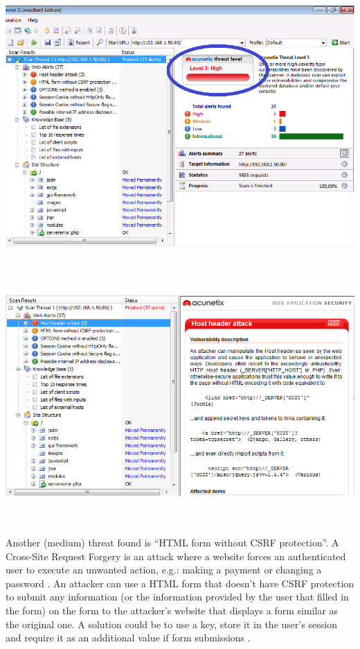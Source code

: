 \documentclass[11pt, a4paper]{article}
\begin{document}
\noindent\begin{minipage}{\textwidth}
    \centering
    \includegraphics[width=\textwidth]{Acunetix_3.png}
\end{minipage}
$\;$ \\ \\
\noindent\begin{minipage}{\textwidth}
    \centering
    \includegraphics[width=\textwidth]{Acunetix_4.png}
\end{minipage}
$\;$ \\ \\
Another (medium) threat found is ``HTML form without CSRF protection''. A Cross-Site Request Forgery is an attack where a website forces an authenticated user to execute an unwanted action, e.g.: making a payment or changing a password \citep{CSRF,CSRF2}. An attacker can use a HTML form that doesn't have CSRF protection to submit any information (or the information provided by the user that filled in the form) on the form to the attacker's website that displays a form similar as the original one. A solution could be to use a key, store it in the user's session and require it as an additional value if form submissions \citep{CSRF3}. \\
\end{document}
